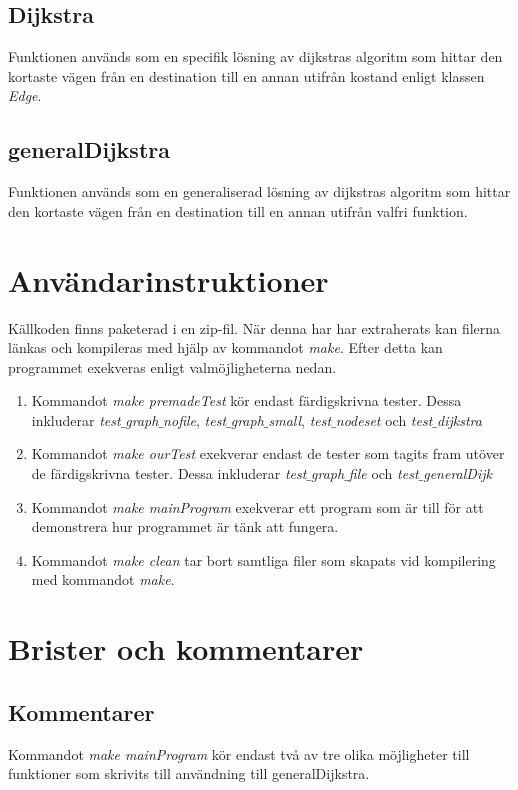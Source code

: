 \documentclass[12pt]{article}
\begin{document}
\subsection*{Dijkstra}
Funktionen används som en specifik lösning av dijkstras algoritm som hittar den kortaste vägen från en destination till en annan utifrån kostand enligt klassen \textit{Edge}.

\subsection*{generalDijkstra}
Funktionen används som en generaliserad lösning av dijkstras algoritm som hittar den kortaste vägen från en destination till en annan utifrån valfri funktion.

\section*{Användarinstruktioner}
Källkoden finns paketerad i en zip-fil. När denna har har extraherats kan filerna länkas och kompileras med hjälp av kommandot \textit{make}. Efter detta kan programmet exekveras enligt valmöjligheterna nedan.
\begin{enumerate}
    \item Kommandot \textit{make premadeTest} kör endast färdigskrivna tester. Dessa inkluderar \textit{test$\_$graph$\_$nofile}, \textit{test$\_$graph$\_$small}, \textit{test$\_$nodeset} och \textit{test$\_$dijkstra}
    \item Kommandot \textit{make ourTest} exekverar endast de tester som tagits fram utöver de färdigskrivna tester. Dessa inkluderar \textit{test$\_$graph$\_$file} och \textit{test$\_$generalDijk} 
    \item Kommandot \textit{make mainProgram} exekverar ett program som är till för att demonstrera hur programmet är tänk att fungera. 
    \item Kommandot \textit{make clean} tar bort samtliga filer som skapats vid kompilering med kommandot \textit{make}.
\end{enumerate}


\section*{Brister och kommentarer}
\subsection*{Kommentarer}
Kommandot \textit{make mainProgram} kör endast två av tre olika möjligheter till funktioner som skrivits till användning till generalDijkstra. \\
\end{document}
